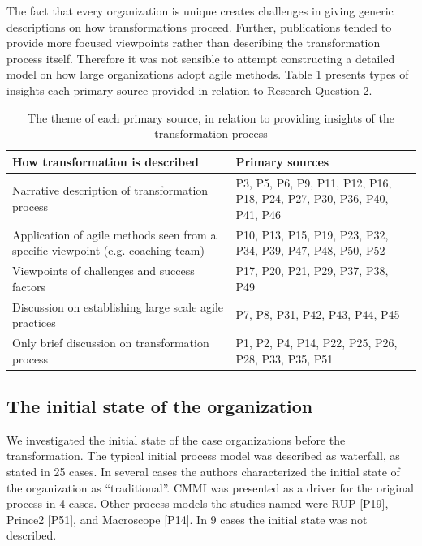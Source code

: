The fact that every organization is unique creates challenges in giving generic
descriptions on how transformations proceed. Further, publications tended to
provide more focused viewpoints rather than describing the transformation
process itself. Therefore it was not sensible to attempt constructing a detailed
model on how large organizations adopt agile methods.
Table \ref{table:transformation_descriptiontypes} presents types of insights
each primary source provided in relation to Research Question 2.

\begin{table}[h]
    \centering
    \begin{tabular}{ >{\raggedright\arraybackslash}p{}
                     >{\raggedright\arraybackslash}p{} }
        \toprule
        How transformation is described   &  Primary sources  \\
        \midrule
        Narrative description of transformation process &
                P3, P5, P6, P9, P11, P12, P16, P18,
                P24, P27, P30, P36, P40, P41, P46   \\
        Application of agile methods seen from a specific viewpoint (e.g. coaching team) &
                P10, P13, P15, P19, P23, P32, P34,
                P39, P47, P48, P50, P52    \\
        Viewpoints of challenges and success factors  &
                P17, P20, P21, P29, P37, P38, P49   \\
        Discussion on establishing large scale agile practices  &
                P7, P8, P31, P42, P43, P44, P45   \\
        Only brief discussion on transformation process  &
                P1, P2, P4, P14, P22, P25, P26, P28, P33, P35, P51  \\
        \bottomrule
    \end{tabular}
    \caption{The theme of each primary source, in relation to providing
             insights of the transformation process}
    \label{table:transformation_descriptiontypes}
\end{table}


\subsection{The initial state of the organization}

We investigated the initial state of the case organizations before the
transformation. The typical initial process model was described as waterfall, as
stated in 25 cases. In several cases the authors characterized the initial state
of the organization as ``traditional''. CMMI was presented as a driver for the
original process in 4 cases. Other process models the studies named were RUP
[P19], Prince2 [P51], and Macroscope [P14]. In 9 cases the initial state was not
described.

